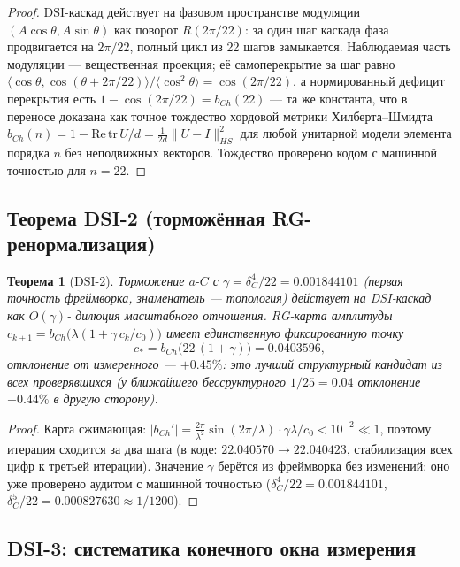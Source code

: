 \documentclass[11pt,a4paper]{article}
\theoremstyle{plain}
\newtheorem{theorem}{Теорема}[section]
\theoremstyle{definition}
\theoremstyle{remark}
\begin{document}
\begin{proof}
DSI-каскад действует на фазовом пространстве модуляции $(A\cos\theta,
A\sin\theta)$ как поворот $R(2\pi/22)$: за один шаг каскада фаза продвигается
на $2\pi/22$, полный цикл из 22 шагов замыкается. Наблюдаемая часть модуляции
--- вещественная проекция; её самоперекрытие за шаг равно
$\langle\cos\theta,\cos(\theta+2\pi/22)\rangle/\langle\cos^2\theta\rangle
=\cos(2\pi/22)$, а нормированный дефицит перекрытия есть
$1-\cos(2\pi/22)=b_{Ch}(22)$ --- та же константа, что в переносе доказана как
точное тождество хордовой метрики Хилберта--Шмидта
$b_{Ch}(n)=1-\mathrm{Re\,tr}\,U/d=\tfrac1{2d}\|U-I\|_{HS}^2$ для любой
унитарной модели элемента порядка $n$ без неподвижных векторов. Тождество
проверено кодом с машинной точностью для $n=22$.
\end{proof}

\subsection{Теорема DSI-2 (торможённая RG-ренормализация)}

\begin{theorem}[DSI-2]\label{th:dsi2}
Торможение $a\text{-}C$ с $\gamma=\delta_C^4/22=0.001844101$ (первая точность
фреймворка, знаменатель --- топология) действует на DSI-каскад как $O(\gamma)$-
дилюция масштабного отношения. RG-карта амплитуды
$c_{k+1}=b_{Ch}\bigl(\lambda(1+\gamma\,c_k/c_0)\bigr)$ имеет единственную
фиксированную точку
\begin{equation}
  c_* = b_{Ch}\bigl(22\,(1+\gamma)\bigr) = 0.0403596,
\end{equation}
отклонение от измеренного --- $+0.45\%$: это лучший структурный кандидат из
всех проверявшихся (у ближайшего бессруктурного $1/25=0.04$ отклонение
$-0.44\%$ в другую сторону).
\end{theorem}

\begin{proof}
Карта сжимающая: $|b_{Ch}'|=\tfrac{2\pi}{\lambda^2}\sin(2\pi/\lambda)\cdot
\gamma\lambda/c_0<10^{-2}\ll1$, поэтому итерация сходится за два шага
(в коде: $22.040570\to22.040423$, стабилизация всех цифр к третьей итерации).
Значение $\gamma$ берётся из фреймворка без изменений: оно уже проверено
аудитом с машинной точностью ($\delta_C^4/22=0.001844101$,
$\delta_C^5/22=0.000827630\approx1/1200$).
\end{proof}

\subsection{DSI-3: систематика конечного окна измерения}
\end{document}
